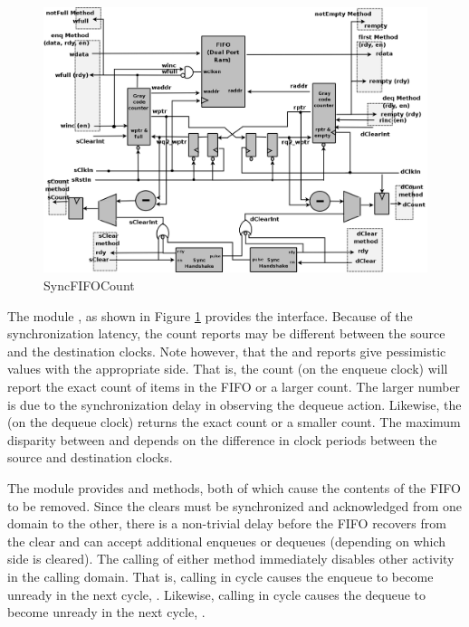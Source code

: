 
\begin{figure}[ht]
\begin{center}
\includegraphics[width  = 5.5 in]{LibFig/syncfifocount}
\caption{SyncFIFOCount}
\label{syncfifocount}
\end{center}
\end{figure}


The module , as shown in Figure
\ref{syncfifocount}  provides the 
interface.  Because of the synchronization latency, the
count reports may  be different between the source
and the destination clocks.  Note
however, that the  and  reports give pessimistic
values with the appropriate side.  That is, the count  (on
the enqueue clock) will report the exact count of items in the FIFO or
a larger count.  The larger number is due to the 
synchronization delay in observing the dequeue action.  Likewise, the
 (on the dequeue clock) returns the exact count or a smaller
count.  The maximum disparity between  and 
depends on the difference in clock periods between the source and
destination clocks.

The module provides   and 
methods, both of which cause the contents of the FIFO to be removed.
Since the clears must be synchronized and acknowledged from one domain
to the other, there is a non-trivial delay before the FIFO recovers
from the clear and can accept additional enqueues or dequeues
(depending on which side is cleared).  The calling of
either method immediately  disables other activity in the calling
domain. That is, calling  in cycle  causes the
enqueue to become unready in the next cycle, .  Likewise, calling
 in cycle  causes the dequeue to become unready in
the next cycle, .

